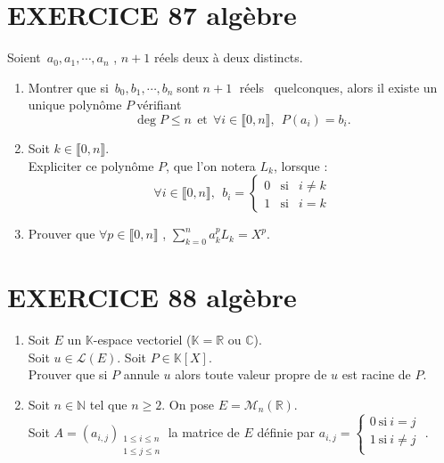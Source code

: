\documentclass[10pt,oneside]{article}
\begin{document}
\begin{flushleft}
\section*{EXERCICE 87 \: algèbre }




Soient\ $a_{0},a_{1},\cdots ,a_{n}$ ,\: $n+1$ réels
deux à deux distincts.
\medskip

\begin{enumerate}
\item Montrer que si\ $b_{0},b_{1},\cdots ,b_{n}\;$sont$\;n+1\;$ réels \
quelconques, alors il existe un unique polyn\^{o}me $P\ $vérifiant
\begin{equation*}
\deg P\leqslant n \:\:\text{et}\:\:\forall i\in \llbracket 0,n\rrbracket,\:\:P\left(
a_{i}\right) =b_{i}.
\end{equation*}

\item Soit $k\in \llbracket 0,n \rrbracket $. \\
Expliciter ce polyn\^{o}me $P
$, que l'on notera $L_{k}$, lorsque :%
\begin{equation*}
\forall i\in \llbracket 0 ,n \rrbracket,  \ \ b_{i}=
\left\{ 
\begin{array}{lll}
0&\text{si}&i\neq k \\ 
1&\text{si}&i=k
\end{array}
\right. 
\end{equation*}

\item
 Prouver que $\forall p\in \llbracket 0 ,n \rrbracket$ ,\:\bigskip
 $\displaystyle\sum\limits_{k=0}^{n}a_{k}^{p}L_{k}=X^{p}$.

\end{enumerate}



\section*{EXERCICE 88 \: algèbre}

\begin{enumerate}
\item
Soit $E$ un $\mathbb{K}$-espace vectoriel ($\mathbb{K}=\mathbb{R}$ ou $\mathbb{C}$).\\
Soit $u\in\mathcal{L}(E)$.
Soit $P\in\mathbb{K}[X]$.\\
Prouver que si $P$ annule $u$ alors toute valeur propre de $u$ est racine de $P$.\\
\item
Soit $n\in\mathbb{N} $ tel que $n\geqslant 2$. On pose $E=\mathcal{M}_n\left( \mathbb{R}\right) $.\\
Soit $A=\left( a_{i,j}\right) _{\substack{ 1\leqslant i\leqslant n  \\ 1\leqslant j\leqslant n}}$ la matrice de $E$ définie par $a_{i,j}=\left\lbrace \begin{array}{l}
0\:\text{si}\:i=j\\
1\:\text{si}\:i\neq j\\
\end{array}\right. $ .\\


\end{enumerate}
\end{flushleft}
\end{document}

